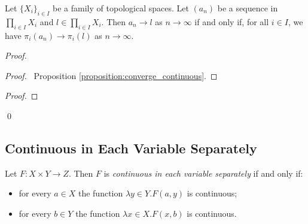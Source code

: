 \begin{proposition}
    \label{proposition:converge_product}
    Let $\{ X_i \}_{i \in I}$ be a family of topological spaces. Let $(a_n)$ be a sequence in $\prod_{i \in I} X_i$ and $l \in \prod_{i \in I} X_i$.
    Then $a_n \rightarrow l$ as $n \rightarrow \infty$ if and only if, for all $i \in I$, we have $\pi_i(a_n) \rightarrow \pi_i(l)$ as $n \rightarrow \infty$.
\end{proposition}

\begin{proof}
    \pf
    \begin{proof}
        \pf\ Proposition \ref{proposition:converge_continuous}.
    \end{proof}
    \begin{proof}
    \end{proof}
    \qed
\end{proof}

\subsection{Continuous in Each Variable Separately}

\begin{definition}
    Let $F : X \times Y \rightarrow Z$. Then $F$ is \emph{continuous in each
    variable separately} if and only if:
    \begin{itemize}
        \item for every $a \in X$ the function $\lambda y \in Y. F(a,y)$ is continuous;
        \item for every $b \in Y$ the function $\lambda x \in X. F(x,b)$ is continuous.
    \end{itemize}
\end{definition}

